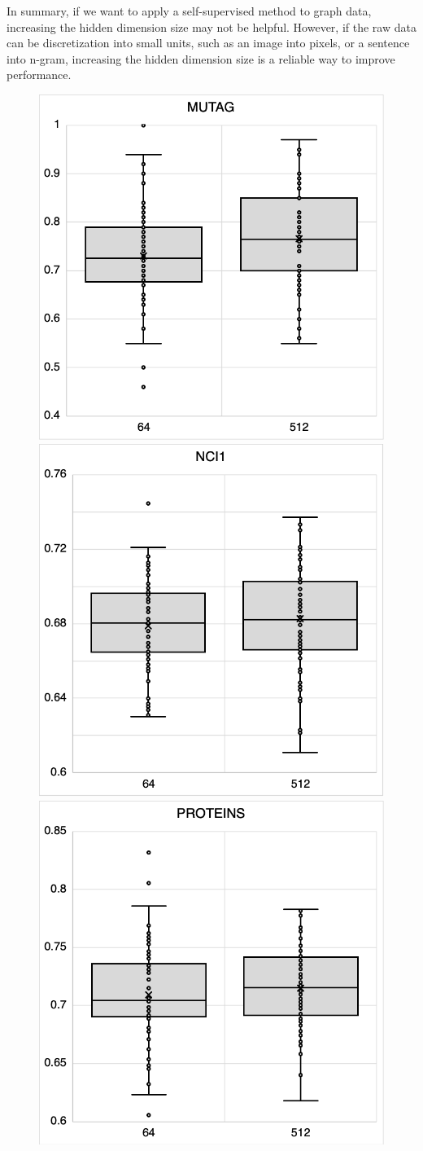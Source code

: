 In summary, if we want to apply a self-supervised method to graph data, increasing the hidden dimension size may not be helpful. However, if the raw data can be discretization into small units, such as an image into pixels, or a sentence into n-gram, increasing the hidden dimension size is a reliable way to improve performance. 


\begin{figure}[htbp]
\centering
    {%
        \includegraphics[width = .48\linewidth]{./figures/5-MUTAG.png}\quad
        \includegraphics[width = .48\linewidth]{./figures/5-NCI1.png}}
    {%
        \includegraphics[width = .48\linewidth]{./figures/5-PROTEINS.png}\quad
}
\end{figure}
